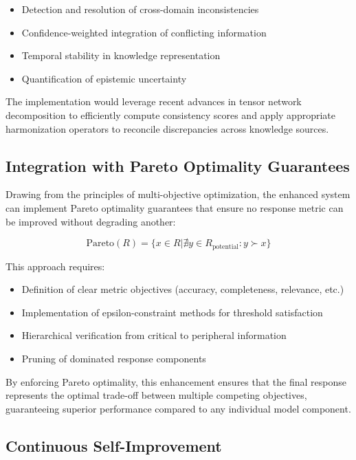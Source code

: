 \documentclass[journal,onecolumn]{IEEEtran}
\begin{document}
\begin{itemize}
\item Detection and resolution of cross-domain inconsistencies
\item Confidence-weighted integration of conflicting information
\item Temporal stability in knowledge representation
\item Quantification of epistemic uncertainty
\end{itemize}

The implementation would leverage recent advances in tensor network decomposition to efficiently compute consistency scores and apply appropriate harmonization operators to reconcile discrepancies across knowledge sources.

\subsection{Integration with Pareto Optimality Guarantees}

Drawing from the principles of multi-objective optimization, the enhanced system can implement Pareto optimality guarantees that ensure no response metric can be improved without degrading another:

\begin{equation}
\text{Pareto}(R) = \{x \in R | \nexists y \in R_{\text{potential}}: y \succ x\}
\end{equation}

This approach requires:

\begin{itemize}
\item Definition of clear metric objectives (accuracy, completeness, relevance, etc.)
\item Implementation of epsilon-constraint methods for threshold satisfaction
\item Hierarchical verification from critical to peripheral information
\item Pruning of dominated response components
\end{itemize}

By enforcing Pareto optimality, this enhancement ensures that the final response represents the optimal trade-off between multiple competing objectives, guaranteeing superior performance compared to any individual model component.

\subsection{Continuous Self-Improvement}
\end{document}
